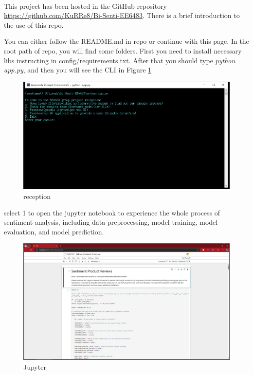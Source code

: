 \documentclass{article}
\begin{document}
\\[10mm]
\begin{flushleft}
This project has been hosted in the GitHub repository \url{https://github.com/KuRRe8/Bi-Senti-EE6483}. There is a brief introduction to the use of this repo.

You can either follow the README.md in repo or continue with this page. In the root path of repo, you will find some folders. First you need to install necessary libs instructing in config/requirements.txt. After that you should type \textit{python app.py}, and then you will see the CLI in Figure \ref{fig:AA0}

\begin{figure}[h]
    \centering
    \includegraphics[width=0.9\linewidth]{reception.png}
    \caption{reception}
    \label{fig:AA0}
\end{figure}

select 1 to open the jupyter notebook to experience the whole process of sentiment analysis, including data preprocessing, model training, model evaluation, and model prediction.

\begin{figure}[h]
    \centering
    \includegraphics[width=1.0\linewidth]{choice1_jupyter_full_routine_of_nlp.png}
    \caption{Jupyter}
    \label{fig:AA1}
\end{figure}



\end{flushleft}
\end{document}
